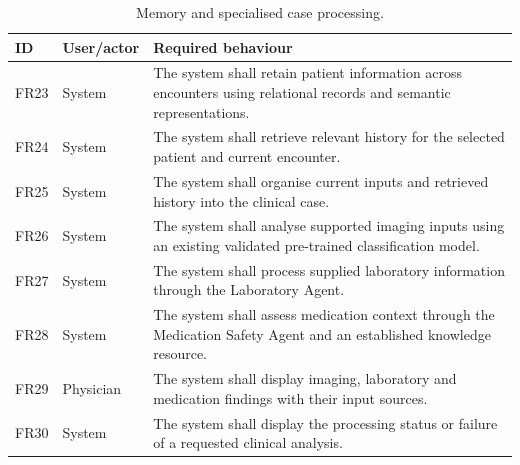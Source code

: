 \begin{table}[htbp]
\centering
\small
\caption{Memory and specialised case processing.}
\label{tab:kashaf:fr-processing}
\begin{tabular}{|p{}|p{}|p{}|}
\hline
ID & User/actor & Required behaviour \\ \hline
FR23 & System & The system shall retain patient information across encounters using relational records and semantic representations. \\ \hline
FR24 & System & The system shall retrieve relevant history for the selected patient and current encounter. \\ \hline
FR25 & System & The system shall organise current inputs and retrieved history into the clinical case. \\ \hline
FR26 & System & The system shall analyse supported imaging inputs using an existing validated pre-trained classification model. \\ \hline
FR27 & System & The system shall process supplied laboratory information through the Laboratory Agent. \\ \hline
FR28 & System & The system shall assess medication context through the Medication Safety Agent and an established knowledge resource. \\ \hline
FR29 & Physician & The system shall display imaging, laboratory and medication findings with their input sources. \\ \hline
FR30 & System & The system shall display the processing status or failure of a requested clinical analysis. \\ \hline
\end{tabular}
\end{table}

